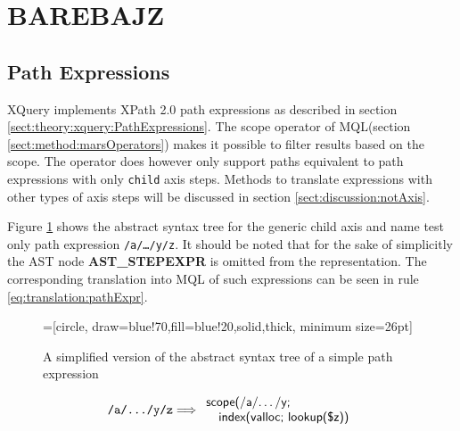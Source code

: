 \newpage
\section{BAREBAJZ}
\label{sect:translation:mXr}



\subsection{Path Expressions}
\label{sect:translation:mXr:smpPathExpr}
XQuery implements XPath 2.0 path expressions as described in section
\ref{sect:theory:xquery:PathExpressions}. The \textsf{scope} operator of
MQL(section \ref{sect:method:marsOperators}) makes it possible to
filter results based on the scope. The operator does however only support paths
equivalent to path expressions with only \texttt{child} axis steps. Methods to
translate expressions with other types of axis steps will be discussed in
section \ref{sect:discussion:notAxis}.

Figure \ref{fig:translation:pathAST} shows the abstract syntax tree for the
generic child axis and name test only path expression \texttt{/a/\ldots/y/z}. It
should be noted that for the sake of simplicitly the AST node \textbf{AST\_STEPEXPR} is
omitted from the representation. The corresponding translation into MQL of such
expressions can be seen in rule \ref{eq:translation:pathExpr}.


\begin{figure}[h]
\centering
{}=[circle, draw=blue!70,fill=blue!20,solid,thick, minimum
size=26pt]
\label{fig:translation:pathAST}
\caption[AST of path expression]{A simplified version of the abstract syntax
tree of a simple path expression}
\end{figure}


\begin{equation}
\centering
\texttt{/a/\ldots/y/z}
\Longrightarrow
\begin{array}{l}
	\mbox{\textsf{scope(/a/\ldots/y;}} \\
	\quad \mbox{\textsf{index(valloc; lookup(\$z))}}
\end{array}
\label{eq:translation:pathExpr}
\end{equation}

